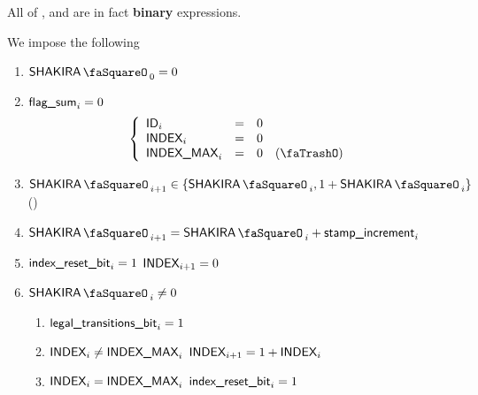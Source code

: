 \saNote{} All of \locStampIncrement{}, \locIndexResetBit{} and \locLegalTransitionsBit{} are in fact \textbf{binary} expressions.

\noindent We impose the following
\begin{enumerate}
        \item $\shakiraStamp_{0} = 0$
        \item \If $\textsf{flag\_sum}_{i} = 0$ \Then
                \[
                        \left\{ \begin{array}{lclr}
                                \shakiraId      _{i} & = & 0 \\
                                \index         _{i} & = & 0 \\
                                \indexMax      _{i} & = & 0  & (\trash) \\
                        \end{array} \right.
                \]
        \item $\shakiraStamp_{i + 1} \in \{ \shakiraStamp_{i}, 1 + \shakiraStamp_{i} \}$ \quad(\trash)
        \item $\shakiraStamp_{i + 1} = \shakiraStamp_{i} + \locStampIncrement_{i}$
        \item \If $\textsf{index\_reset\_bit}_{i} = 1$ \Then $\textsf{INDEX}_{i + 1} = 0$
        \item \If $\shakiraStamp_{i} \neq 0$ \Then
                \begin{enumerate}
                        \item $\textsf{legal\_transitions\_bit}_{i} = 1$
                        \item \If $\textsf{INDEX}_{i} \neq \textsf{INDEX\_MAX}_{i}$ \Then $\textsf{INDEX}_{i + 1} = 1 + \textsf{INDEX}_{i}$
                        \item \If $\textsf{INDEX}_{i} =    \textsf{INDEX\_MAX}_{i}$ \Then $\textsf{index\_reset\_bit}_{i} = 1$

\end{enumerate}
\end{enumerate}
